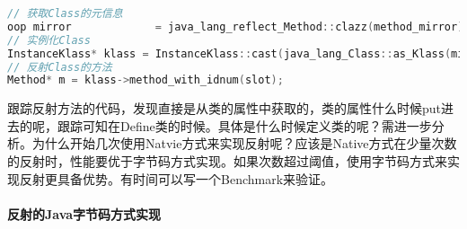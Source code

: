 \documentclass[../../../interview-questions.tex]{subfiles}
\begin{document}
\begin{lstlisting}[language=C++]
// 获取Class的元信息
oop mirror             = java_lang_reflect_Method::clazz(method_mirror);
// 实例化Class
InstanceKlass* klass = InstanceKlass::cast(java_lang_Class::as_Klass(mirror));
// 反射Class的方法
Method* m = klass->method_with_idnum(slot);
\end{lstlisting}

跟踪反射方法的代码，发现直接是从类的属性中获取的，类的属性什么时候put进去的呢，跟踪可知在Define类的时候。具体是什么时候定义类的呢？需进一步分析。为什么开始几次使用Natvie方式来实现反射呢？应该是Native方式在少量次数的反射时，性能要优于字节码方式实现。如果次数超过阈值，使用字节码方式来实现反射更具备优势。有时间可以写一个Benchmark来验证。

\paragraph{反射的Java字节码方式实现}
\end{document}
